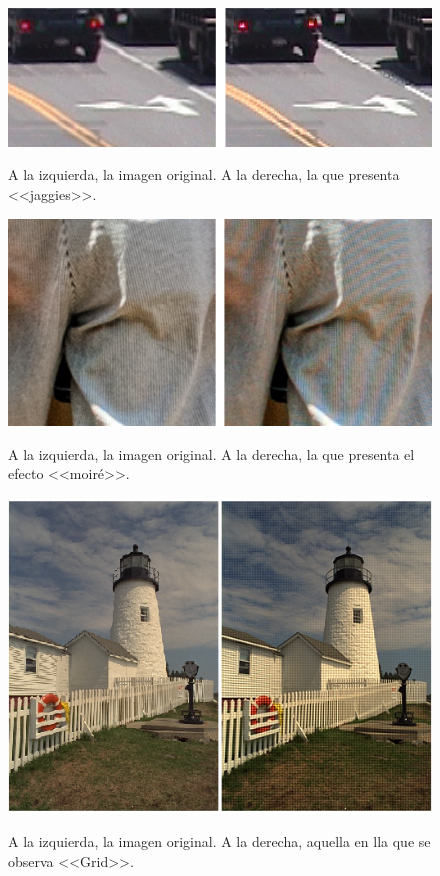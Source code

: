 \documentclass[a4paper]{article}
\begin{document}
\begin{figure}[h!]
	\caption{A la izquierda, la imagen original. A la derecha, la que presenta <<jaggies>>.}
	\begin{center}
	\includegraphics[scale=0.50]{imagenes/jaggies}
	\label{jaggies}
  \end{center}
\end{figure}

\newpage

\begin{figure}[h!]
	\caption{A la izquierda, la imagen original. A la derecha, la que presenta el efecto <<moiré>>.}
	\begin{center}
	\includegraphics[scale=0.50]{imagenes/moire}
	\label{moire}
  \end{center}
\end{figure}

\begin{figure}[h!]
	\caption{A la izquierda, la imagen original. A la derecha, aquella en lla que se observa <<Grid>>.}
	\begin{center}
	\includegraphics[scale=0.66]{imagenes/grid}
	\label{grid}
  \end{center}
\end{figure}
\end{document}
